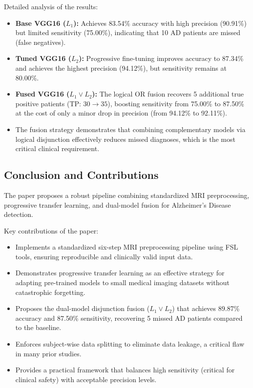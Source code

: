 Detailed analysis of the results:
\begin{itemize}
    \item \textbf{Base VGG16 ($L_1$):} Achieves 83.54\% accuracy with high precision (90.91\%) but limited sensitivity (75.00\%), indicating that 10 AD patients are missed (false negatives).
    \item \textbf{Tuned VGG16 ($L_2$):} Progressive fine-tuning improves accuracy to 87.34\% and achieves the highest precision (94.12\%), but sensitivity remains at 80.00\%.
    \item \textbf{Fused VGG16 ($L_1 \lor L_2$):} The logical OR fusion recovers 5 additional true positive patients (TP: $30 \to 35$), boosting sensitivity from 75.00\% to 87.50\% at the cost of only a minor drop in precision (from 94.12\% to 92.11\%).
    \item The fusion strategy demonstrates that combining complementary models via logical disjunction effectively reduces missed diagnoses, which is the most critical clinical requirement.
\end{itemize}

\subsection{Conclusion and Contributions}
The paper proposes a robust pipeline combining standardized MRI preprocessing, progressive transfer learning, and dual-model fusion for Alzheimer's Disease detection.

Key contributions of the paper:
\begin{itemize}
    \item Implements a standardized six-step MRI preprocessing pipeline using FSL tools, ensuring reproducible and clinically valid input data.
    \item Demonstrates progressive transfer learning as an effective strategy for adapting pre-trained models to small medical imaging datasets without catastrophic forgetting.
    \item Proposes the dual-model disjunction fusion ($L_1 \lor L_2$) that achieves 89.87\% accuracy and 87.50\% sensitivity, recovering 5 missed AD patients compared to the baseline.
    \item Enforces subject-wise data splitting to eliminate data leakage, a critical flaw in many prior studies.
    \item Provides a practical framework that balances high sensitivity (critical for clinical safety) with acceptable precision levels.
\end{itemize}

